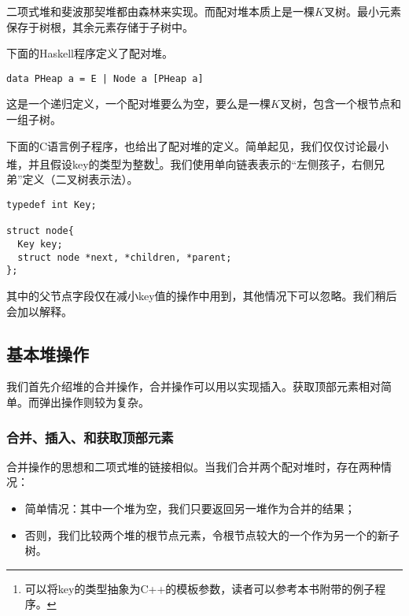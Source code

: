 \documentclass[UTF8]{article}
\begin{document}
二项式堆和斐波那契堆都由森林来实现。而配对堆本质上是一棵$K$叉树。最小元素保存于树根，其余元素存储于子树中。

下面的Haskell程序定义了配对堆。

\lstset{language=Haskell}
\begin{lstlisting}
data PHeap a = E | Node a [PHeap a]
\end{lstlisting}

这是一个递归定义，一个配对堆要么为空，要么是一棵$K$叉树，包含一个根节点和一组子树。

下面的C语言例子程序，也给出了配对堆的定义。简单起见，我们仅仅讨论最小堆，并且假设key的类型为整数\footnote{可以将key的类型抽象为C++的模板参数，读者可以参考本书附带的例子程序。}。我们使用单向链表表示的“左侧孩子，右侧兄弟”定义（二叉树表示法\cite{CLRS}）。

\lstset{language=C}
\begin{lstlisting}
typedef int Key;

struct node{
  Key key;
  struct node *next, *children, *parent;
};
\end{lstlisting}

其中的父节点字段仅在减小key值的操作中用到，其他情况下可以忽略。我们稍后会加以解释。


\subsection{基本堆操作}

我们首先介绍堆的合并操作，合并操作可以用以实现插入。获取顶部元素相对简单。而弹出操作则较为复杂。

\subsubsection{合并、插入、和获取顶部元素}
 

合并操作的思想和二项式堆的链接相似。当我们合并两个配对堆时，存在两种情况：

\begin{itemize}
\item 简单情况：其中一个堆为空，我们只要返回另一堆作为合并的结果；

\item 否则，我们比较两个堆的根节点元素，令根节点较大的一个作为另一个的新子树。
\end{itemize}
\end{document}
